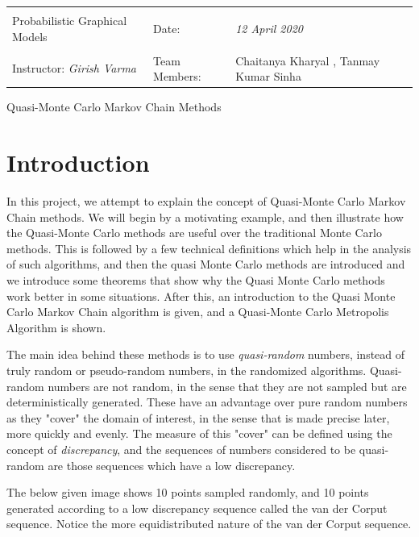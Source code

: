 \documentclass[12pt,letterpaper, twoside]{article}
\theoremstyle{definition}
\begin{document}
\begin{table}[!h]
\centering
\begin{tabularx}{\textwidth}{|Xll|}
\hline
& &\\
Probabilistic Graphical Models &  Date: & \emph{12 April 2020}\\
 & &\\
Instructor: \emph{Girish Varma} & Team Members: & {Chaitanya Kharyal , Tanmay Kumar Sinha} \\ 
 \hline

\end{tabularx}
\end{table}

\begin{center}
\begin{LARGE}
Quasi-Monte Carlo Markov Chain Methods
\end{LARGE}
\end{center}

\tableofcontents

\section{Introduction}
In this project, we attempt to explain the concept of Quasi-Monte Carlo Markov Chain methods. We will begin by a motivating example, and then illustrate how the Quasi-Monte Carlo methods are useful over the traditional Monte Carlo methods. This is followed by a few technical definitions which help in the analysis of such algorithms, and then the quasi Monte Carlo methods are introduced and we introduce some theorems that show why the Quasi Monte Carlo methods work better in some situations. After this, an introduction to the Quasi Monte Carlo Markov Chain algorithm is given, and a Quasi-Monte Carlo Metropolis Algorithm is shown.


The main idea behind these methods is to use \emph{quasi-random}
 numbers, instead of truly random or pseudo-random numbers, in the randomized algorithms. Quasi-random numbers are not random, in the sense that they are not sampled but are deterministically generated. These have an advantage over pure random numbers as they "cover" the domain of interest, in the sense that is made precise later, more quickly and evenly. The measure of this "cover" can be defined using the concept of \emph{discrepancy}, and the sequences of numbers considered to be quasi-random are those sequences which have a low discrepancy.

The below given image shows 10 points sampled randomly, and 10 points generated according to a low discrepancy sequence called the van der Corput sequence. Notice the more equidistributed nature of the van der Corput sequence.
\end{document}
